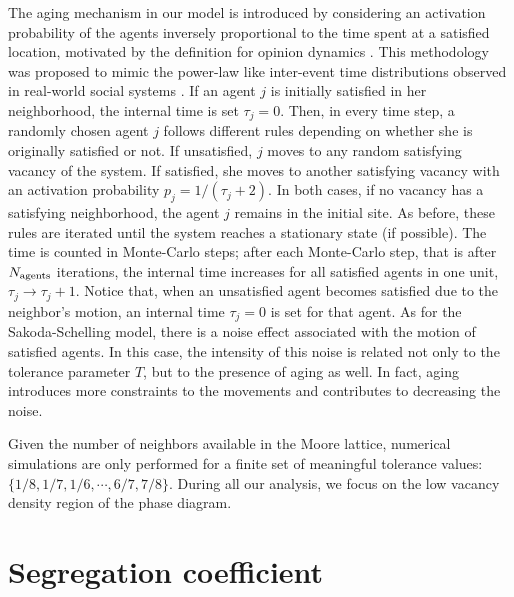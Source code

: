 The aging mechanism in our model is introduced by considering an activation probability of the agents inversely proportional to the time spent at a satisfied location, motivated by the definition for opinion dynamics \cite{artime-2018}. This methodology was proposed to mimic the power-law like inter-event time distributions observed in real-world social systems \cite{barabasi-2005,fernandez-gracia-2011}. If an agent $j$ is initially satisfied in her neighborhood, the internal time is set $\tau_j = 0$. Then, in every time step, a randomly chosen agent $j$ follows different rules depending on whether she is originally satisfied or not. If unsatisfied, $j$ moves to any random satisfying vacancy of the system. If satisfied, she moves to another satisfying vacancy with an activation probability $p_j = 1 / (\tau_j + 2)$. In both cases, if no vacancy has a satisfying neighborhood, the agent $j$ remains in the initial site. As before, these rules are iterated until the system reaches a stationary state (if possible). The time is counted in Monte-Carlo steps; after each Monte-Carlo step, that is after $N_{\rm agents}$ iterations, the internal time increases for all satisfied agents in one unit, $\tau_j \to \tau_j + 1$. Notice that, when an unsatisfied agent becomes satisfied due to the neighbor's motion, an internal time $\tau_j = 0$ is set for that agent. As for the Sakoda-Schelling model, there is a noise effect associated with the motion of satisfied agents. In this case, the intensity of this noise is related not only to the tolerance parameter $T$, but to the presence of aging as well. In fact, aging introduces more constraints to the movements and contributes to decreasing the noise.  

Given the number of neighbors available in the Moore lattice, numerical simulations are only performed for a finite set of meaningful tolerance values: $\{1/8,1/7,1/6, \cdots ,6/7,7/8 \}$. During all our analysis, we focus on the low vacancy density region of the phase diagram.

\section{Segregation coefficient}

